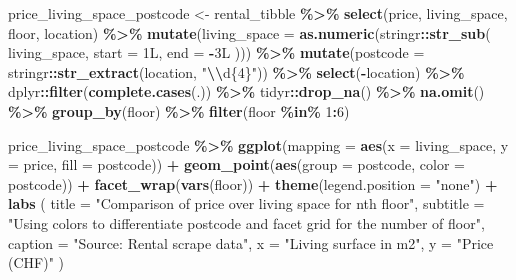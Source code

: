 \documentclass[
]{article}
\newenvironment{Shaded}{\begin{snugshade}}{\end{snugshade}}
\newcommand{\AttributeTok}[1]{\textcolor[rgb]{0.13,0.29,0.53}{#1}}
\newcommand{\DecValTok}[1]{\textcolor[rgb]{0.00,0.00,0.81}{#1}}
\newcommand{\FunctionTok}[1]{\textcolor[rgb]{0.13,0.29,0.53}{\textbf{#1}}}
\newcommand{\NormalTok}[1]{#1}
\newcommand{\OtherTok}[1]{\textcolor[rgb]{0.56,0.35,0.01}{#1}}
\newcommand{\SpecialCharTok}[1]{\textcolor[rgb]{0.81,0.36,0.00}{\textbf{#1}}}
\newcommand{\StringTok}[1]{\textcolor[rgb]{0.31,0.60,0.02}{#1}}
\begin{document}
\begin{Shaded}
\begin{Highlighting}[]
\NormalTok{price\_living\_space\_postcode }\OtherTok{\textless{}{-}}\NormalTok{ rental\_tibble }\SpecialCharTok{\%\textgreater{}\%}
  \FunctionTok{select}\NormalTok{(price, living\_space, floor, location) }\SpecialCharTok{\%\textgreater{}\%}
  \FunctionTok{mutate}\NormalTok{(}\AttributeTok{living\_space =} \FunctionTok{as.numeric}\NormalTok{(stringr}\SpecialCharTok{::}\FunctionTok{str\_sub}\NormalTok{(}
\NormalTok{    living\_space, }\AttributeTok{start =}\NormalTok{ 1L, }\AttributeTok{end =} \SpecialCharTok{{-}}\NormalTok{3L}
\NormalTok{  ))) }\SpecialCharTok{\%\textgreater{}\%}
  \FunctionTok{mutate}\NormalTok{(}\AttributeTok{postcode =}\NormalTok{ stringr}\SpecialCharTok{::}\FunctionTok{str\_extract}\NormalTok{(location, }\StringTok{"}\SpecialCharTok{\textbackslash{}\textbackslash{}}\StringTok{d\{4\}"}\NormalTok{)) }\SpecialCharTok{\%\textgreater{}\%}
  \FunctionTok{select}\NormalTok{(}\SpecialCharTok{{-}}\NormalTok{location) }\SpecialCharTok{\%\textgreater{}\%}
\NormalTok{  dplyr}\SpecialCharTok{::}\FunctionTok{filter}\NormalTok{(}\FunctionTok{complete.cases}\NormalTok{(.)) }\SpecialCharTok{\%\textgreater{}\%}
\NormalTok{  tidyr}\SpecialCharTok{::}\FunctionTok{drop\_na}\NormalTok{() }\SpecialCharTok{\%\textgreater{}\%}
  \FunctionTok{na.omit}\NormalTok{() }\SpecialCharTok{\%\textgreater{}\%}
  \FunctionTok{group\_by}\NormalTok{(floor) }\SpecialCharTok{\%\textgreater{}\%}
  \FunctionTok{filter}\NormalTok{(floor }\SpecialCharTok{\%in\%} \DecValTok{1}\SpecialCharTok{:}\DecValTok{6}\NormalTok{)}

\NormalTok{price\_living\_space\_postcode }\SpecialCharTok{\%\textgreater{}\%} \FunctionTok{ggplot}\NormalTok{(}\AttributeTok{mapping =} \FunctionTok{aes}\NormalTok{(}\AttributeTok{x =}\NormalTok{ living\_space, }\AttributeTok{y =}\NormalTok{ price, }\AttributeTok{fill =}
\NormalTok{                                                       postcode)) }\SpecialCharTok{+}
  \FunctionTok{geom\_point}\NormalTok{(}\FunctionTok{aes}\NormalTok{(}\AttributeTok{group =}\NormalTok{ postcode, }\AttributeTok{color =}\NormalTok{ postcode)) }\SpecialCharTok{+} \FunctionTok{facet\_wrap}\NormalTok{(}\FunctionTok{vars}\NormalTok{(floor)) }\SpecialCharTok{+}
  \FunctionTok{theme}\NormalTok{(}\AttributeTok{legend.position =} \StringTok{"none"}\NormalTok{) }\SpecialCharTok{+}
  \FunctionTok{labs}\NormalTok{ (}
    \AttributeTok{title =} \StringTok{"Comparison of price over living space for nth floor"}\NormalTok{,}
    \AttributeTok{subtitle =} \StringTok{"Using colors to differentiate postcode and facet grid for the number of floor"}\NormalTok{,}
    \AttributeTok{caption =} \StringTok{"Source: Rental scrape data"}\NormalTok{,}
    \AttributeTok{x =} \StringTok{"Living surface in m2"}\NormalTok{,}
    \AttributeTok{y =} \StringTok{"Price (CHF)"}
\NormalTok{  )}
\end{Highlighting}
\end{Shaded}
\end{document}
